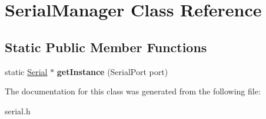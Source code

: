 \hypertarget{classSerialManager}{}\section{Serial\+Manager Class Reference}
\label{classSerialManager}
\subsection*{Static Public Member Functions}
\begin{DoxyCompactItemize}
\item 
\mbox{\label{classSerialManager_a6b9c81d22a14b2c3a072a4c2120e5ae7}} 
static \hyperlink{classSerial}{Serial} $\ast$ {\bfseries get\+Instance} (Serial\+Port port)
\end{DoxyCompactItemize}


The documentation for this class was generated from the following file\+:\begin{DoxyCompactItemize}
\item 
serial.\+h\end{DoxyCompactItemize}

